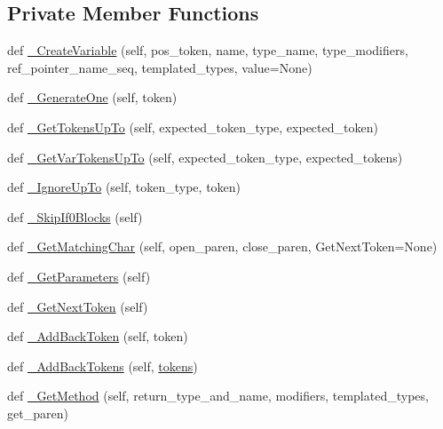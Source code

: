\subsection*{Private Member Functions}
\begin{DoxyCompactItemize}
\item 
def \hyperlink{classcpp_1_1ast_1_1AstBuilder_aed483f6f87068092d41c7b612553b330}{\+\_\+\+Create\+Variable} (self, pos\+\_\+token, name, type\+\_\+name, type\+\_\+modifiers, ref\+\_\+pointer\+\_\+name\+\_\+seq, templated\+\_\+types, value=None)
\item 
def \hyperlink{classcpp_1_1ast_1_1AstBuilder_ae3a006851c8f8a4b5929e5e8bcbd4618}{\+\_\+\+Generate\+One} (self, token)
\item 
def \hyperlink{classcpp_1_1ast_1_1AstBuilder_a93e70a799351e5c40f07efb218889b31}{\+\_\+\+Get\+Tokens\+Up\+To} (self, expected\+\_\+token\+\_\+type, expected\+\_\+token)
\item 
def \hyperlink{classcpp_1_1ast_1_1AstBuilder_a0b5b10f2608ba3e8851fbd65d51b1f22}{\+\_\+\+Get\+Var\+Tokens\+Up\+To} (self, expected\+\_\+token\+\_\+type, expected\+\_\+tokens)
\item 
def \hyperlink{classcpp_1_1ast_1_1AstBuilder_affc78a722f3038f6384147512fa8ef89}{\+\_\+\+Ignore\+Up\+To} (self, token\+\_\+type, token)
\item 
def \hyperlink{classcpp_1_1ast_1_1AstBuilder_a2e872094ebb16513f608e1be21c41dd0}{\+\_\+\+Skip\+If0\+Blocks} (self)
\item 
def \hyperlink{classcpp_1_1ast_1_1AstBuilder_a30936331903fe395451f8ed8ea2c26ba}{\+\_\+\+Get\+Matching\+Char} (self, open\+\_\+paren, close\+\_\+paren, Get\+Next\+Token=None)
\item 
def \hyperlink{classcpp_1_1ast_1_1AstBuilder_a89bbfbdcc6d029629f304aa9b643faf3}{\+\_\+\+Get\+Parameters} (self)
\item 
def \hyperlink{classcpp_1_1ast_1_1AstBuilder_ac22b5683a8f1a86a49751d6d0bcd4b84}{\+\_\+\+Get\+Next\+Token} (self)
\item 
def \hyperlink{classcpp_1_1ast_1_1AstBuilder_a264b4e18c07863c4dae117fe623a0fb2}{\+\_\+\+Add\+Back\+Token} (self, token)
\item 
def \hyperlink{classcpp_1_1ast_1_1AstBuilder_aa148966c6578f4560a4164db33df0fcf}{\+\_\+\+Add\+Back\+Tokens} (self, \hyperlink{classcpp_1_1ast_1_1AstBuilder_a1b21f8bef712e91862ccb6b1147cab0d}{tokens})
\item 
def \hyperlink{classcpp_1_1ast_1_1AstBuilder_ad1d43eb0d4bdc6be1a9d7ff86c54bd66}{\+\_\+\+Get\+Method} (self, return\+\_\+type\+\_\+and\+\_\+name, modifiers, templated\+\_\+types, get\+\_\+paren)

\end{DoxyCompactItemize}
